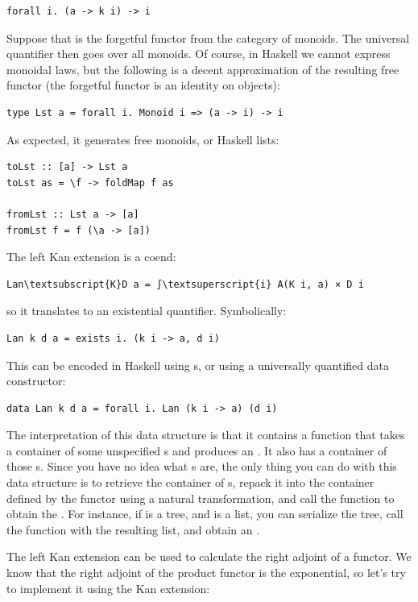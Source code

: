 \begin{verbatim}
forall i. (a -> k i) -> i
\end{verbatim}
Suppose that  is the forgetful functor from the category of
monoids. The universal quantifier then goes over all monoids. Of course,
in Haskell we cannot express monoidal laws, but the following is a
decent approximation of the resulting free functor (the forgetful
functor  is an identity on objects):

\begin{verbatim}
type Lst a = forall i. Monoid i => (a -> i) -> i
\end{verbatim}
As expected, it generates free monoids, or Haskell lists:

\begin{verbatim}
toLst :: [a] -> Lst a
toLst as = \f -> foldMap f as

fromLst :: Lst a -> [a]
fromLst f = f (\a -> [a])
\end{verbatim}
The left Kan extension is a coend:

\begin{Verbatim}[commandchars=\\\{\}]
Lan\textsubscript{K}D a = ∫\textsuperscript{i} A(K i, a) × D i
\end{Verbatim}
so it translates to an existential quantifier. Symbolically:

\begin{verbatim}
Lan k d a = exists i. (k i -> a, d i)
\end{verbatim}
This can be encoded in Haskell using s, or using a universally
quantified data constructor:

\begin{verbatim}
data Lan k d a = forall i. Lan (k i -> a) (d i)
\end{verbatim}
The interpretation of this data structure is that it contains a function
that takes a container of some unspecified s and produces an
. It also has a container of those s. Since you have
no idea what s are, the only thing you can do with this data
structure is to retrieve the container of s, repack it into
the container defined by the functor  using a natural
transformation, and call the function to obtain the . For
instance, if  is a tree, and  is a list, you can
serialize the tree, call the function with the resulting list, and
obtain an .

The left Kan extension can be used to calculate the right adjoint of a
functor. We know that the right adjoint of the product functor is the
exponential, so let's try to implement it using the Kan extension:


